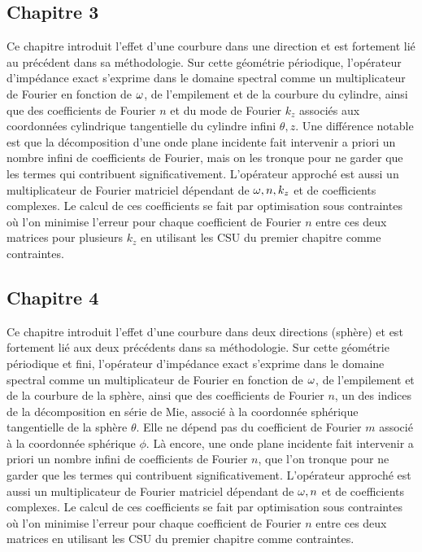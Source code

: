 \subsection*{Chapitre 3}
Ce chapitre introduit l'effet d'une courbure dans une direction et est fortement lié au précédent dans sa méthodologie.
Sur cette géométrie périodique, l'opérateur d'impédance exact s'exprime dans le domaine spectral comme un multiplicateur de Fourier en fonction de \(\omega\), de l'empilement et de la courbure du cylindre, ainsi que des coefficients de Fourier \(n\) et du mode de Fourier \(k_z\) associés aux coordonnées cylindrique tangentielle du cylindre infini \(\theta,z\).
Une différence notable est que la décomposition d'une onde plane incidente fait intervenir a priori un nombre infini de coefficients de Fourier, mais on les tronque pour ne garder que les termes qui contribuent significativement.
L'opérateur approché est aussi un multiplicateur de Fourier matriciel dépendant de \(\omega, n, k_z\) et de coefficients complexes.
Le calcul de ces coefficients se fait par optimisation sous contraintes où l'on minimise l'erreur pour chaque coefficient de Fourier \(n\) entre ces deux matrices pour plusieurs \(k_z\) en utilisant les CSU du premier chapitre comme contraintes.

\subsection*{Chapitre 4}
Ce chapitre introduit l'effet d'une courbure dans deux directions (sphère) et est fortement lié aux deux précédents dans sa méthodologie.
Sur cette géométrie périodique et fini, l'opérateur d'impédance exact s'exprime dans le domaine spectral comme un multiplicateur de Fourier en fonction de \(\omega\), de l'empilement et de la courbure de la sphère, ainsi que des coefficients de Fourier \(n\), un des indices de la décomposition en série de Mie, associé à la coordonnée sphérique tangentielle de la sphère \(\theta\).
Elle ne dépend pas du coefficient de Fourier \(m\) associé à la coordonnée sphérique \(\phi\).
Là encore, une onde plane incidente fait intervenir a priori un nombre infini de coefficients de Fourier \(n\), que l'on tronque pour ne garder que les termes qui contribuent significativement.
L'opérateur approché est aussi un multiplicateur de Fourier matriciel dépendant de \(\omega, n\) et de coefficients complexes.
Le calcul de ces coefficients se fait par optimisation sous contraintes où l'on minimise l'erreur pour chaque coefficient de Fourier \(n\) entre ces deux matrices en utilisant les CSU du premier chapitre comme contraintes.

